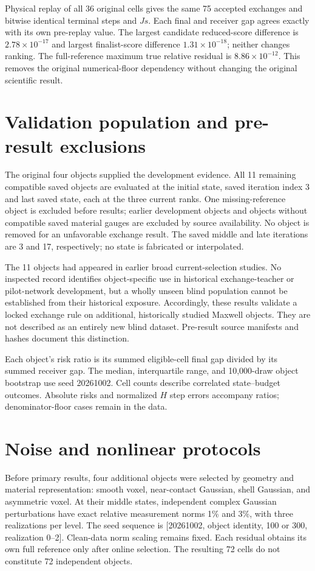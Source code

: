 \documentclass[11pt]{article}
\begin{document}
Physical replay of all 36 original cells gives the same 75 accepted exchanges and bitwise identical terminal steps and $Js$. Each final and receiver gap agrees exactly with its own pre-replay value. The largest candidate reduced-score difference is $2.78\times10^{-17}$ and largest finalist-score difference $1.31\times10^{-18}$; neither changes ranking. The full-reference maximum true relative residual is $8.86\times10^{-12}$. This removes the original numerical-floor dependency without changing the original scientific result.

\section{Validation population and pre-result exclusions}
The original four objects supplied the development evidence. All 11 remaining compatible saved objects are evaluated at the initial state, saved iteration index 3 and last saved state, each at the three current ranks. One missing-reference object is excluded before results; earlier development objects and objects without compatible saved material gauges are excluded by source availability. No object is removed for an unfavorable exchange result. The saved middle and late iterations are 3 and 17, respectively; no state is fabricated or interpolated.

The 11 objects had appeared in earlier broad current-selection studies. No inspected record identifies object-specific use in historical exchange-teacher or pilot-network development, but a wholly unseen blind population cannot be established from their historical exposure. Accordingly, these results validate a locked exchange rule on additional, historically studied Maxwell objects. They are not described as an entirely new blind dataset. Pre-result source manifests and hashes document this distinction.

Each object's risk ratio is its summed eligible-cell final gap divided by its summed receiver gap. The median, interquartile range, and 10,000-draw object bootstrap use seed 20261002. Cell counts describe correlated state--budget outcomes. Absolute risks and normalized $H$ step errors accompany ratios; denominator-floor cases remain in the data.

\section{Noise and nonlinear protocols}
Before primary results, four additional objects were selected by geometry and material representation: smooth voxel, near-contact Gaussian, shell Gaussian, and asymmetric voxel. At their middle states, independent complex Gaussian perturbations have exact relative measurement norms 1\% and 3\%, with three realizations per level. The seed sequence is [20261002, object identity, 100 or 300, realization 0--2]. Clean-data norm scaling remains fixed. Each residual obtains its own full reference only after online selection. The resulting 72 cells do not constitute 72 independent objects.
\end{document}
